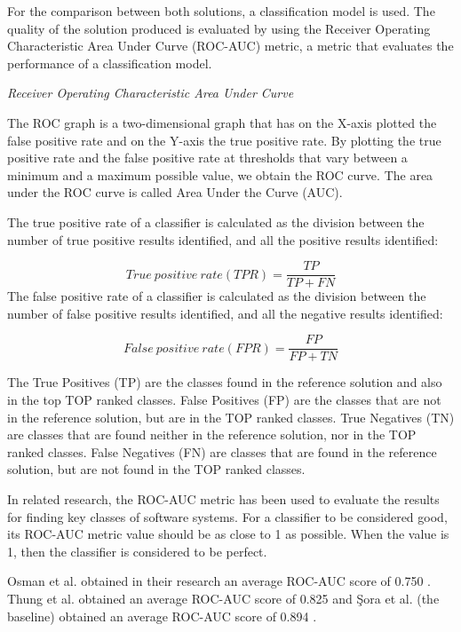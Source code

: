 \documentclass[runningheads]{comsis2}
\begin{document}
For the comparison between both solutions, a classification model is used. The quality of the solution produced is evaluated by using the Receiver Operating Characteristic Area Under Curve (ROC-AUC) metric, a metric that evaluates the performance of a classification model.


\textit{Receiver Operating Characteristic Area Under Curve}


The ROC graph is a two-dimensional graph that has on the X-axis plotted the false positive rate and on the Y-axis the true positive rate. By plotting the true positive rate and the false positive rate at thresholds that vary between a minimum and a maximum possible value, we obtain the ROC curve. The area under the ROC curve is called Area Under the Curve (AUC).

The true positive rate of a classifier is calculated as the division between the number of true positive results identified, and all the positive results identified:

\begin{equation}
 True\ positive\ rate (TPR) = \frac{TP}{TP+FN}
\end{equation}
The false positive rate of a classifier is calculated as the division between the number of false positive results identified, and all the negative results identified:

\begin{equation}
 False\ positive\ rate (FPR) = \frac{FP}{FP+TN}
\end{equation}

The True Positives (TP) are the classes found in the reference solution and also in the top TOP ranked classes. False Positives (FP) are the classes that are not in the reference solution, but are in the TOP ranked classes.
True Negatives (TN) are classes that are found neither in the reference solution, nor in the TOP ranked classes. False Negatives (FN) are classes that are found in the reference solution, but are not found in the TOP ranked classes.

In related research, the ROC-AUC metric has been used to evaluate the results for finding key classes of software systems.
For a classifier to be considered good, its ROC-AUC metric value should be as close to 1 as possible. When the value is 1, then the classifier is considered to be perfect.

Osman et al. obtained in their research an average ROC-AUC score of 0.750 \cite{6676885}. Thung et al. obtained an average ROC-AUC score of 0.825 \cite{rocclasification}  and Şora et al. (the baseline) obtained an average ROC-AUC score of 0.894 \cite{Finding-key-classes}.
\end{document}

